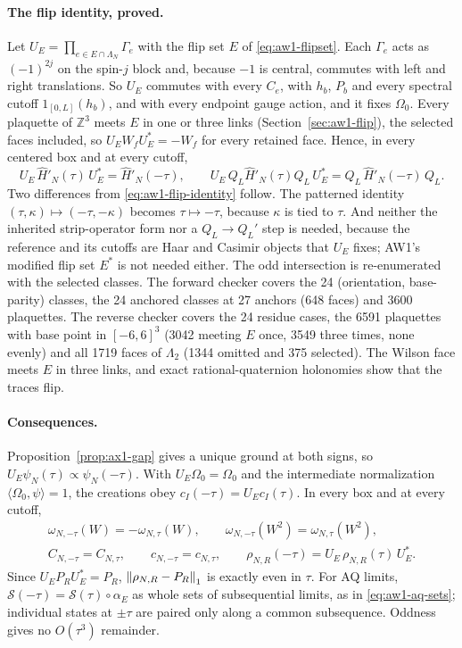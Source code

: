 \paragraph{The flip identity, proved.}
Let $U_E=\prod_{e\in E\cap\Lambda_N}\Gamma_e$ with the flip set $E$ of
\eqref{eq:aw1-flipset}. Each $\Gamma_e$ acts as $(-1)^{2j}$ on the spin-$j$
block and, because $-1$ is central, commutes with left and right
translations. So $U_E$ commutes with every $C_e$, with $h_b$, $P_b$ and every
spectral cutoff $1_{[0,L]}(h_b)$, and with every endpoint gauge action, and it
fixes $\Omega_0$. Every plaquette of $\mathbb Z^3$ meets $E$ in one or three
links (Section~\ref{sec:aw1-flip}), the selected faces included, so
$U_EW_fU_E^*=-W_f$ for every retained face. Hence, in every centered box and
at every cutoff,
\begin{equation}
 U_E\,\widehat H'_N(\tau)\,U_E^*=\widehat H'_N(-\tau),\qquad
 U_E\,Q_L\widehat H'_N(\tau)Q_L\,U_E^*=Q_L\,\widehat H'_N(-\tau)\,Q_L .
 \label{eq:ax1-flip}
\end{equation}
Two differences from \eqref{eq:aw1-flip-identity} follow. The patterned
identity $(\tau,\kappa)\mapsto(-\tau,-\kappa)$ becomes $\tau\mapsto-\tau$,
because $\kappa$ is tied to $\tau$. And neither the inherited strip-operator
form nor a $Q_L\to Q_L'$ step is needed, because the reference and its cutoffs
are Haar and Casimir objects that $U_E$ fixes; AW1's modified flip set $E^*$
is not needed either. The odd intersection is re-enumerated with the selected
classes. The forward checker covers the 24 (orientation, base-parity) classes,
the 24 anchored classes at 27 anchors (648 faces) and 3600 plaquettes. The
reverse checker covers the 24 residue cases, the 6591 plaquettes with base
point in $[-6,6]^3$ (3042 meeting $E$ once, 3549 three times, none evenly)
and all 1719 faces of $\Lambda_2$ (1344 omitted and 375 selected). The Wilson
face meets $E$ in three links, and exact rational-quaternion holonomies show
that the traces flip.

\paragraph{Consequences.}
Proposition~\ref{prop:ax1-gap} gives a unique ground at both signs, so
$U_E\psi_N(\tau)\propto\psi_N(-\tau)$. With $U_E\Omega_0=\Omega_0$ and the
intermediate normalization $\langle\Omega_0,\psi\rangle=1$, the creations obey
$c_I(-\tau)=U_Ec_I(\tau)$. In every box and at every cutoff,
\begin{equation}
 \begin{gathered}
 \omega_{N,-\tau}(W)=-\omega_{N,\tau}(W),\qquad
 \omega_{N,-\tau}(W^2)=\omega_{N,\tau}(W^2),\\
 C_{N,-\tau}=C_{N,\tau},\qquad c_{N,-\tau}=c_{N,\tau},\qquad
 \rho_{N,R}(-\tau)=U_E\,\rho_{N,R}(\tau)\,U_E^* .
 \end{gathered}
 \label{eq:ax1-covariance}
\end{equation}
Since $U_EP_RU_E^*=P_R$, $\left\lVert\rho_{N,R}-P_R\right\rVert_1$ is exactly even in $\tau$.
For AQ limits, $\mathcal S(-\tau)=\mathcal S(\tau)\circ\alpha_E$ as whole sets
of subsequential limits, as in \eqref{eq:aw1-aq-sets}; individual states at
$\pm\tau$ are paired only along a common subsequence. Oddness gives no
$O(\tau^3)$ remainder.

